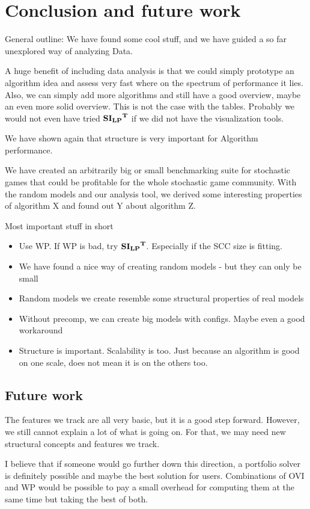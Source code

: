 \chapter{Conclusion and future work} \label{ch:conclusion}
General outline: We have found some cool stuff, and we have guided a so far unexplored way of analyzing Data.

A huge benefit of including data analysis is that we could simply prototype an algorithm idea and assess very fast where on the spectrum of performance it lies.
Also, we can simply add more algorithms and still have a good overview, maybe an even more solid overview. This is not the case with the tables.
Probably we would not even have tried $\mathbf{\mathbf{SI_{LP}}^T}$ if we did not have the visualization tools.

We have shown again that structure is very important for Algorithm performance.

We have created an arbitrarily big or small benchmarking suite for stochastic games that could be profitable for the whole stochastic game community.
With the random models and our analysis tool, we derived some interesting properties of algorithm X and found out Y about algorithm Z.


Most important stuff in short
\begin{itemize}
    \item Use WP. If WP is bad, try $\mathbf{\mathbf{SI_{LP}}^T}$. Especially if the SCC size is fitting.
    \item We have found a nice way of creating random models - but they can only be small
    \item Random models we create resemble some structural properties of real models
    \item Without precomp, we can create big models with configs. Maybe even a good workaround
    \item Structure is important. Scalability is too. Just because an algorithm is good on one scale, does not mean it is on the others too.
\end{itemize}

\section{Future work}
The features we track are all very basic, but it is a good step forward. However, we still cannot explain a lot of what is going on.
For that, we may need new structural concepts and features we track.

I believe that if someone would go further down this direction, a portfolio solver is definitely possible and maybe the best solution for users.
Combinations of OVI and WP would be possible to pay a small overhead for computing them at the same time but taking the best of both.

